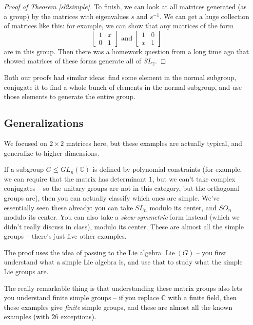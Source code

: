 \begin{proof}[Proof of Theorem \ref{sl2simple}]
    To finish, we can look at all matrices generated (as a group) by the matrices with eigenvalues $s$ and $s^{-1}$. We can get a huge collection of matrices like this: for example, we can show that any matrices of the form \[\begin{bmatrix} 1 & x \\ 0 & 1 \end{bmatrix} \text{ and } \begin{bmatrix} 1& 0 \\ x & 1 \end{bmatrix}\] are in this group. Then there was a homework question from a long time ago that showed matrices of these forms generate all of $SL_2$. 
\end{proof}

Both our proofs had similar ideas: find some element in the normal subgroup, conjugate it to find a whole bunch of elements in the normal subgroup, and use those elements to generate the entire group. 

\subsection{Generalizations}

We focused on $2 \times 2$ matrices here, but these examples are actually typical, and generalize to higher dimensions. 

If a subgroup $G \leq GL_n(\mathbb{C})$ is defined by polynomial constraints (for example, we can require that the matrix has determinant $1$, but we can't take complex conjugates -- so the unitary groups are not in this category, but the orthogonal groups are), then you can actually classify which ones are simple. We've essentially seen these already: you can take $SL_n$ modulo its center, and $SO_n$ modulo its center. You can also take a \emph{skew-symmetric} form instead (which we didn't really discuss in class), modulo its center. These are almost all the simple groups -- there's just five other examples.

The proof uses the idea of passing to the Lie algebra $\operatorname{Lie}(G)$ -- you first understand what a simple Lie algebra is, and use that to study what the simple Lie groups are. 

The really remarkable thing is that understanding these matrix groups also lets you understand finite simple groups -- if you replace $\mathbb{C}$ with a finite field, then these examples give \emph{finite} simple groups, and these are almost all the known examples (with $26$ exceptions). 

